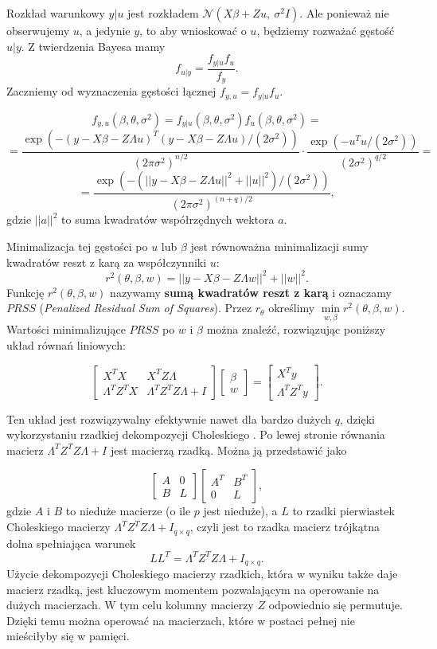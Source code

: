 \documentclass[12pt]{mwbk}
\theoremstyle{plain}
\theoremstyle{definition}
\theoremstyle{definition}
\begin{document}
Rozkład warunkowy $y|u$ jest rozkładem $\mathcal{N}(X\beta+Zu,~\sigma^2I)$. Ale ponieważ nie obserwujemy $u$, a jedynie $y$, to aby wnioskować o $u$, będziemy rozważać gęstość $u|y$. Z twierdzenia Bayesa \cite{bayes} mamy $$f_{u|y}=\frac{f_{y|u}f_u}{f_y}.$$ Zaczniemy od wyznaczenia gęstości łącznej $f_{y,u}=f_{y|u}f_u$.

$$f_{y,u}(\beta, \theta, \sigma^2)=f_{y|u}(\beta, \theta, \sigma^2)f_u(\beta, \theta, \sigma^2)=$$
$$=\frac{\exp(-(y-X\beta -Z \Lambda u)^T(y-X\beta-Z\Lambda u)/(2\sigma^2))}{(2\pi \sigma^2)^{n/2}}\cdot \frac{\exp(-u^Tu/(2\sigma^2))}{(2\sigma^2)^{q/2}}=$$
$$=\frac{\exp(-(||y-X\beta-Z\Lambda u||^2+||u||^2)/(2\sigma^2))}{(2\pi \sigma^2)^{(n+q)/2}},$$ gdzie $||a||^2$ to suma kwadratów współrzędnych wektora $a$.

Minimalizacja tej gęstości po $u$ lub $\beta$ jest równoważna minimalizacji sumy kwadratów reszt z karą za współczynniki $u$:
$$r^2(\theta, \beta, w)=||y-X\beta-Z\Lambda w||^2+||w||^2.$$ Funkcję $r^2(\theta, \beta, w)$ nazywamy \textbf{sumą kwadratów reszt z karą} i oznaczamy $PRSS$ (\textit{Penalized Residual Sum of Squares}). Przez $r_{\theta}$ określimy $\min\limits_{w,\beta} r^2(\theta, \beta,w)$. Wartości minimalizujące $PRSS$ po $w$ i $\beta$ można znaleźć, rozwiązując poniższy układ równań liniowych:

\begin{equation} \label{eq:ukladPRSS}
\begin{bmatrix}
X^TX & X^TZ\Lambda \\
\Lambda^TZ^TX & \Lambda^TZ^TZ\Lambda +I
\end{bmatrix}
\begin{bmatrix}
\beta \\
w
\end{bmatrix}=
\begin{bmatrix}
X^Ty\\
\Lambda^TZ^Ty
\end{bmatrix}.
\end{equation}

Ten układ jest rozwiązywalny efektywnie nawet dla bardzo dużych $q$, dzięki wykorzystaniu rzadkiej dekompozycji Choleskiego \cite{cholesky}. Po lewej stronie równania macierz $\Lambda^TZ^TZ\Lambda+I$ jest macierzą rzadką. Można ją przedstawić jako

$$\begin{bmatrix}
A & 0 \\
B & L
\end{bmatrix}
\begin{bmatrix}
A^T & B^T\\
0 & L
\end{bmatrix},
$$
gdzie $A$ i $B$ to nieduże macierze (o ile $p$ jest nieduże), a $L$ to rzadki pierwiastek Choleskiego macierzy $\Lambda^TZ^TZ\Lambda+I_{q\times q}$, czyli jest to rzadka macierz trójkątna dolna spełniająca warunek $$LL^T=\Lambda^TZ^TZ\Lambda +I_{q \times q}.$$ Użycie dekompozycji Choleskiego macierzy rzadkich, która w wyniku także daje macierz rzadką, jest kluczowym momentem pozwalającym na operowanie na dużych macierzach. W tym celu kolumny macierzy $Z$ odpowiednio się permutuje. Dzięki temu można operować na macierzach, które w postaci pełnej nie mieściłyby się w pamięci.
\end{document}
